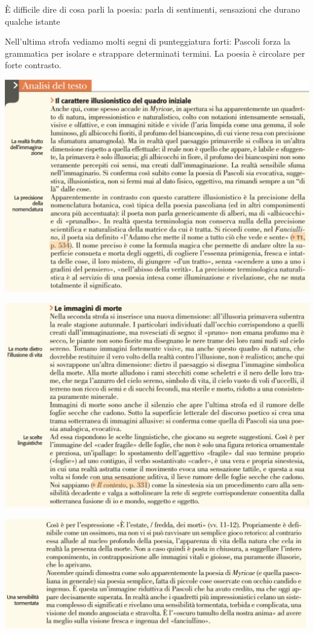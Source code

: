 \documentclass[a4paper, twoside, titlepage]{book}
\begin{document}
È difficile dire di cosa parli la poesia: parla di sentimenti, sensazioni che durano qualche istante

Nell'ultima strofa vediamo molti segni di punteggiatura forti: Pascoli forza la grammatica per isolare e strappare determinati termini. La poesia è circolare per forte contrasto.

\begin{center}
\includegraphics[width=\textwidth]{novembre1}
\end{center}
\vfill
\begin{center}
\includegraphics[width=\textwidth]{novembre2}
\end{center}

\begin{center}
\includegraphics[width=\textwidth]{novembre3}
\end{center}
\end{document}
